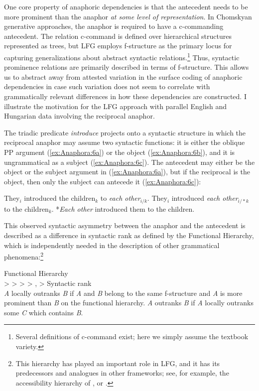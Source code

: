 \documentclass[output=paper,hidelinks]{langscibook}
\begin{document}
One core property of anaphoric dependencies is that the antecedent needs to be more prominent than the anaphor \emph{at some level of representation}. In Chomskyan generative approaches, the anaphor is required to have a c-commanding antecedent. The relation c-command is defined over hierarchical structures represented as trees, but LFG employs f-structure as the primary locus for capturing generalizations about abstract syntactic relations.\footnote{Several definitions of c-command exist; here we simply assume the textbook variety.} Thus, syntactic prominence relations are primarily described in terms of f-structure. This allows us to abstract away from attested variation in the surface coding of anaphoric dependencies in case such variation does not seem to correlate with grammatically relevant differences in how these dependencies are constructed. I illustrate the motivation for the LFG approach with parallel English and Hungarian data involving the reciprocal anaphor.

The triadic predicate \emph{introduce} projects onto a syntactic structure in which the reciprocal anaphor may assume two syntactic functions: it is either the oblique PP argument (\ref{ex:Anaphora:6a}) or the object (\ref{ex:Anaphora:6b}), and it is ungrammatical as a subject (\ref{ex:Anaphora:6c}). The antecedent may either be the object or the subject argument in (\ref{ex:Anaphora:6a}), but if the reciprocal is the object, then only the subject can antecede it (\ref{ex:Anaphora:6c}):

\ea\label{ex:Anaphora:6}
\ea\label{ex:Anaphora:6a} They$_i$ introduced the children$_k$ to \emph{each other}$_{i/k}$.
\ex\label{ex:Anaphora:6b} They$_i$ introduced \emph{each other}$_{i/*k}$ to the children$_k$.
\ex\label{ex:Anaphora:6c} *\emph{Each other} introduced them to the children.
\z\z

\noindent This observed syntactic asymmetry between the anaphor and the antecedent is described as a difference in syntactic rank as defined by the Functional Hierarchy, which is independently needed in the description of other grammatical phenomena:\footnote{\label{fn:Anaphora:3}This hierarchy has played an important role in LFG, and it has its predecessors and analogues in other frameworks; see, for example, the accessibility hierarchy of \citet{keenan1977noun}, or \citet{Pollard1992-cv}.}

\ea\label{ex:Anaphora:7}
\ea\label{ex:Anaphora:7a} Functional Hierarchy \citep[229]{BresnanEtAl2016}\\[1ex]
 \SUBJ > \OBJ > \OBJTHETA > \OBLTHETA > \COMP, \XCOMP > \ADJ
 \newpage
\ex\label{ex:Anaphora:7b} Syntactic rank \citep[230]{BresnanEtAl2016}\\[1ex]
 \textit{A} locally outranks \textit{B} if \textit{A} and \textit{B} belong to the same f-structure and \textit{A} is more prominent than \textit{B} on the functional hierarchy. \textit{A} outranks \textit{B} if \textit{A} locally outranks some \textit{C} which contains \textit{B}.
\z\z
\end{document}
